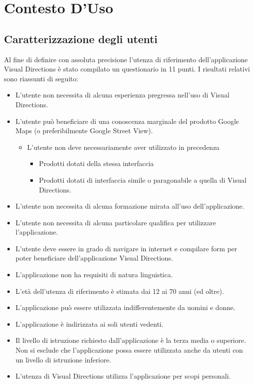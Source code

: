 \documentclass[12pt,a4paper,openright, notitlepage]{report}
\begin{document}
\section{Contesto D'Uso}

\subsection{Caratterizzazione degli utenti}

Al fine di definire con assoluta precisione l’utenza di riferimento dell’applicazione Visual Directions è stato compilato un questionario in 11 punti. I risultati relativi sono riassunti di seguito:

\begin{itemize}
	\item L’utente non necessita di alcuna esperienza pregressa nell’uso di Visual Directions.
	\item L’utente può beneficiare di una conoscenza marginale del prodotto Google Maps (o preferibilmente Google Street View).
	\begin{itemize}
		\item L’utente non deve necessariamente aver utilizzato in precedenza
		\begin{itemize}
			\item Prodotti dotati della stessa interfaccia
			\item Prodotti dotati di interfaccia simile o paragonabile a quella di Visual Directions.
		\end{itemize}			
	\end{itemize}

	\item L’utente non necessita di alcuna formazione mirata all’uso dell’applicazione.
	\item L’utente non necessita di alcuna particolare qualifica per utilizzare l’applicazione.
	\item L’utente deve essere in grado di navigare in internet e compilare form per poter beneficiare dell’applicazione Visual Directions.
	\item L’applicazione non ha requisiti di natura linguistica.
	\item L’età dell’utenza di riferimento è stimata dai 12 ai 70 anni (ed oltre).
	\item L’applicazione può essere utilizzata indifferentemente da uomini e donne.
	\item L’applicazione è indirizzata ai soli utenti vedenti.
	\item Il livello di istruzione richiesto dall’applicazione è la terza media o superiore. Non si esclude che l’applicazione possa essere utilizzata anche da utenti con un livello di istruzione inferiore.
	\item L’utenza di Visual Directions utilizza l’applicazione per scopi personali.
\end{itemize}
\end{document}
